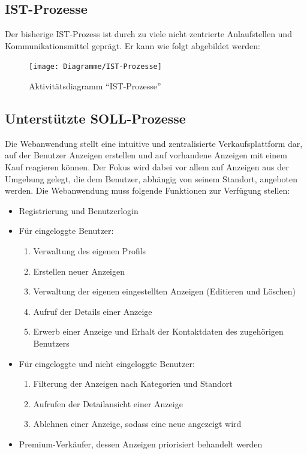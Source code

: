 \documentclass[a4paper,12pt,oneside]{scrartcl}
\begin{document}
\subsection{IST-Prozesse}
Der bisherige IST-Prozess ist durch zu viele nicht zentrierte Anlaufstellen und Kommunikationsmittel geprägt.
Er kann wie folgt abgebildet werden:

\begin{figure}[!htbp]
\centering
\noindent\texttt{[image: Diagramme/IST-Prozesse]}
\caption{Aktivitätsdiagramm "`IST-Prozesse"'}
\end{figure}
\FloatBarrier


\subsection{Unterstützte SOLL-Prozesse}
Die Webanwendung stellt eine intuitive und zentralisierte Verkaufsplattform dar, auf der Benutzer Anzeigen erstellen und auf vorhandene Anzeigen mit einem Kauf reagieren können.
Der Fokus wird dabei vor allem auf Anzeigen aus der Umgebung gelegt, die dem Benutzer, abhängig von seinem Standort, angeboten werden.
Die Webanwendung muss folgende Funktionen zur Verfügung stellen:
\begin{itemize}
	\item Registrierung und Benutzerlogin
	\item Für eingeloggte Benutzer:
	\begin{enumerate}
		\item Verwaltung des eigenen Profils
		\item Erstellen neuer Anzeigen
		\item Verwaltung der eigenen eingestellten Anzeigen (Editieren und Löschen)
		\item Aufruf der Details einer Anzeige
		\item Erwerb einer Anzeige und Erhalt der Kontaktdaten des zugehörigen Benutzers
	\end{enumerate}
	\item Für eingeloggte und nicht eingeloggte Benutzer:
	\begin{enumerate}
		\item Filterung der Anzeigen nach Kategorien und Standort
		\item Aufrufen der Detailansicht einer Anzeige
		\item Ablehnen einer Anzeige, sodass eine neue angezeigt wird
	\end{enumerate}
	\item Premium-Verkäufer, dessen Anzeigen priorisiert behandelt werden
\end{itemize}
\end{document}
